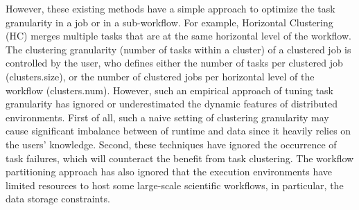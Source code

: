 However, these existing methods have a simple approach to optimize the task granularity in a job or in a sub-workflow. For example, Horizontal Clustering (HC) \cite{Singh2008} merges multiple tasks that are at the same horizontal level of the workflow. The clustering granularity (number of tasks within a cluster) of a clustered job is controlled by the user, who defines either the number of tasks per clustered job (clusters.size), or the number of clustered jobs per horizontal level of the workflow (clusters.num). However, such an empirical approach of tuning task granularity has ignored or underestimated the dynamic features of distributed environments. First of all,  such a naive setting of clustering granularity may cause significant imbalance between of runtime and data since it heavily relies on the users' knowledge. Second, these techniques have ignored the occurrence of task failures, which will counteract the benefit from task clustering. The workflow partitioning approach \cite{Rynge2012} has also ignored that the execution environments have limited resources to host some large-scale scientific workflows, in particular, the data storage constraints.





